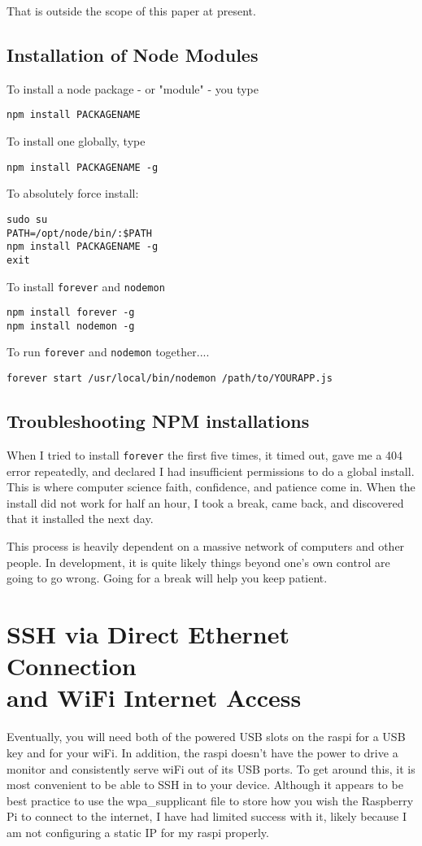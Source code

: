 That is outside the scope of this paper at present. 

\subsection{Installation of Node Modules}
To install a node package - or "module" - you type 

\begin{lstlisting}
npm install PACKAGENAME
\end{lstlisting}

To install one globally, type
\begin{lstlisting}
npm install PACKAGENAME -g
\end{lstlisting}


To absolutely force install:
\begin{lstlisting}
sudo su
PATH=/opt/node/bin/:$PATH
npm install PACKAGENAME -g
exit
\end{lstlisting}

To install \texttt{forever} and \texttt{nodemon}
\begin{lstlisting}
npm install forever -g
npm install nodemon -g
\end{lstlisting}

To run \texttt{forever} and \texttt{nodemon} together....
\begin{lstlisting}
forever start /usr/local/bin/nodemon /path/to/YOURAPP.js
\end{lstlisting}

\subsection{Troubleshooting NPM installations}
When I tried to install \texttt{forever} the first five times, it timed out, gave me a 404 error repeatedly, and declared I had insufficient permissions to do a global install. This is where computer science faith, confidence, and patience come in. When the install did not work for half an hour, I took a break, came back, and discovered that it installed the next day.

This process is heavily dependent on a massive network of computers and other people. In development, it is quite likely things beyond one's own control are going to go wrong. Going for a break will help you keep patient.

\section{SSH via Direct Ethernet Connection\\ and WiFi Internet Access}
Eventually, you will need both of the powered USB slots on the raspi for a USB key and for your wiFi. In addition, the raspi doesn't have the power to drive a monitor and consistently serve wiFi out of its USB ports. To get around this, it is most convenient to be able to SSH in to your device. Although it appears to be best practice to use the wpa_supplicant file to store how you wish the Raspberry Pi to connect to the internet, I have had limited success with it, likely because I am not configuring a static IP for my raspi properly.


